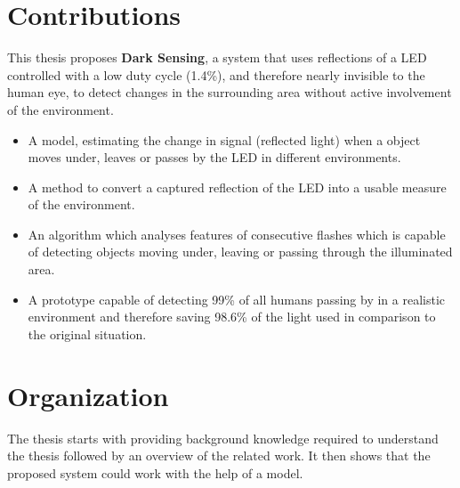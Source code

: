 \section{Contributions}
\label{sec:Contributions}
This thesis proposes \textbf{Dark Sensing}, a system that uses reflections of a LED controlled with a low duty cycle (1.4\%), and therefore nearly invisible to the human eye, to detect changes in the surrounding area without active involvement of the environment.
\begin{itemize}\itemsep2pt
	\item A model, estimating the change in signal (reflected light) when a object moves under, leaves or passes by the LED in different environments.
	\item A method to convert a captured reflection of the LED into a usable measure of the environment.
	\item An algorithm which analyses features of consecutive flashes which is capable of detecting objects moving under, leaving or passing through the illuminated area.
	\item A prototype capable of detecting 99\% of all humans passing by in a realistic environment and therefore saving 98.6\% of the light used in comparison to the original situation.
\end{itemize}

\section{Organization}
\label{sec:Organization}
The thesis starts with providing background knowledge required to understand the thesis followed by an overview of the related work. It then shows that the proposed system could work with the help of a model. 